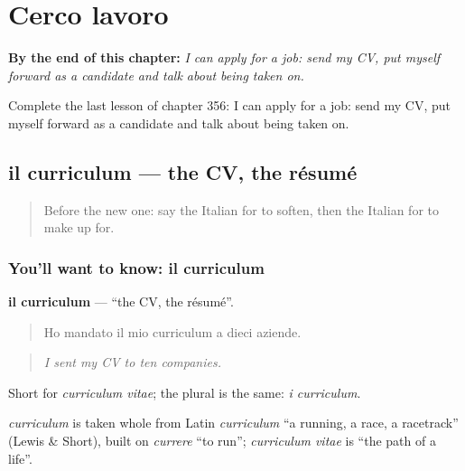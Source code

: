 
\chapter{Cerco lavoro}
\label{ch:it-cerco-lavoro}

\begin{chapteropening}
\textbf{By the end of this chapter:} \emph{I can apply for a job: send my CV, put myself forward as a candidate and talk about being taken on.}

Complete the last lesson of chapter 356: I can apply for a job: send my CV, put myself forward as a candidate and talk about being taken on.
\end{chapteropening}

\section[il curriculum]{il curriculum — the CV, the résumé}

\label{lesson:IT-C356-curriculum}



\begin{quote}
Before the new one: say the Italian for to soften, then the Italian for to make up for.
\end{quote}

\subsection*{You'll want to know: il curriculum}
\textbf{il curriculum} — \textquotedblleft{}the CV, the résumé\textquotedblright{}.

\begin{quote}
Ho mandato il mio curriculum a dieci aziende.
\end{quote}

\begin{quote}
\emph{I sent my CV to ten companies.}
\end{quote}

Short for \emph{curriculum vitae}; the plural is the same: \emph{i curriculum}.

\begin{cousinweb}
\emph{curriculum} is taken whole from Latin \emph{curriculum} \textquotedblleft{}a running, a race, a racetrack\textquotedblright{} (Lewis \& Short), built on \emph{currere} \textquotedblleft{}to run\textquotedblright{}; \emph{curriculum vitae} is \textquotedblleft{}the path of a life\textquotedblright{}.
\end{cousinweb}


